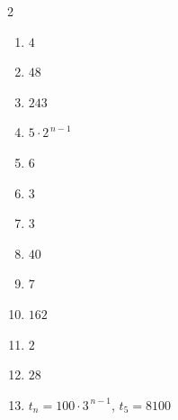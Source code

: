 \documentclass[11pt]{article}
\begin{document}
\begin{keybox}
\begin{multicols}{2}
\small
\begin{enumerate}[leftmargin=*,itemsep=3pt]
  \item $4$
  \item $48$
  \item $243$
  \item $5\cdot2^{\,n-1}$
  \item $6$
  \item $3$
  \item $3$
  \item $40$
  \item $7$
  \item $162$
  \item $2$
  \item $28$
  \item $t_n=100\cdot3^{\,n-1}$, $t_5=8100$
\end{enumerate}
\end{multicols}
\end{keybox}
\end{document}
